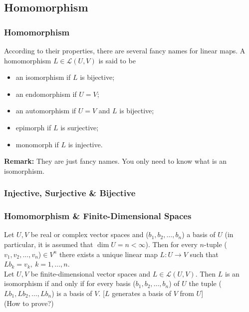 \documentclass[12pt, t]{beamer}
\newcommand{\myseries}[2]{$#1_1,#1_2,\dots,#1_#2$}
\newcommand{\nullspace}{~\\[15pt]}
\newcommand{\remark}{\textbf{Remark: }}
\begin{document}
\subsection{Homomorphism}
\begin{frame}
    \frametitle{Homomorphism}
    According to their properties, there are several fancy names for linear
    maps. A homomorphism $L\in\mathcal{L}(U,V)$ is said to be
    \begin{itemize}
        \item an isomorphism if $L$ is bijective;
        \item an endomorphism if $U=V$;
        \item an automorphism if $U=V$ and $L$ is bijective;
        \item epimorph if $L$ is surjective;
        \item monomorph if $L$ is injective.
    \end{itemize}

    \remark They are just fancy names. You only need to know what is an isomorphism.
\end{frame}

\begin{frame}
    \frametitle{Injective, Surjective \& Bijective}



\end{frame}

\begin{frame}
    \frametitle{Homomorphism \& Finite-Dimensional Spaces}
    Let $U,V$ be real or complex vector spaces and (\myseries{b}{n}) a basis of $U$ (in particular, it is assumed that $\dim U=n<\infty$). Then for every $n$-tuple (\myseries{v}{n})$\in V^n$ there exists a unique linear map $L:U\to V$ such that $Lb_k=v_k,~k=1,\ldots,n.$
    \nullspace
    Let $U,V$ be finite-dimensional vector spaces and $L\in\mathcal{L}(U,V)$. Then $L$ is an isomorphism if and only if for every basis (\myseries{b}{n}) of $U$ the tuple (\myseries{Lb}{n}) is a basis of $V$. [$L$ generates a basis of $V$ from $U$]
    \nullspace
    (How to prove?)
\end{frame}
\end{document}
